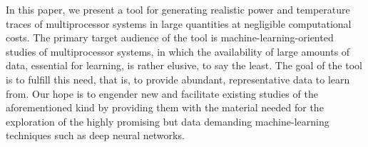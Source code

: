 In this paper, we present a tool for generating realistic power and temperature
traces of multiprocessor systems in large quantities at negligible computational
costs. The primary target audience of the tool is machine-learning-oriented
studies of multiprocessor systems, in which the availability of large amounts of
data, essential for learning, is rather elusive, to say the least. The goal of
the tool is to fulfill this need, that is, to provide abundant, representative
data to learn from. Our hope is to engender new and facilitate existing studies
of the aforementioned kind by providing them with the material needed for the
exploration of the highly promising but data demanding machine-learning
techniques such as deep neural networks.
